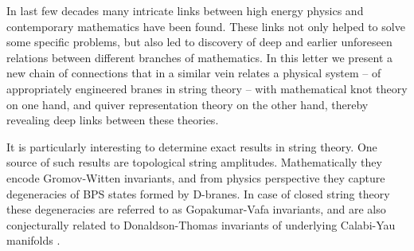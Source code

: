 \documentclass[
 reprint,
 amsmath,amssymb,
 aps,prl
]{revtex4-1}
\begin{document}
\maketitle




In last few decades many intricate links between high energy physics and contemporary mathematics have been found. These links not only helped to solve some specific problems, but also led to discovery of deep and earlier unforeseen relations between different branches of mathematics. In this letter we present a new chain of connections that in a similar vein relates a physical system -- of appropriately engineered branes in string theory -- with mathematical knot theory on one hand, and quiver representation theory on the other hand, thereby revealing deep links between these theories.

It is particularly interesting to determine exact results in string theory. One source of such results are topological string amplitudes. Mathematically they encode Gromov-Witten invariants, and from physics perspective they capture degeneracies of BPS states formed by D-branes. In case of closed string theory these degeneracies are referred to as Gopakumar-Vafa invariants, and are also conjecturally related to Donaldson-Thomas invariants of underlying Calabi-Yau manifolds \cite{Gopakumar:1998jq,maulik2006,Hori:2003ic}. 
\end{document}
